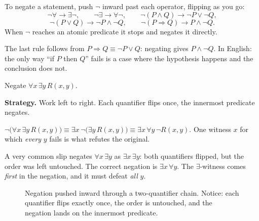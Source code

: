\begin{principle}
To negate a statement, push $\lnot$ inward past each operator, flipping as you go:
\[
\lnot\forall \to \exists\lnot,\qquad
\lnot\exists \to \forall\lnot,\qquad
\lnot(P\land Q) \to \lnot P \lor \lnot Q,
\]
\[
\lnot(P\lor Q) \to \lnot P \land \lnot Q,\qquad
\lnot(P \Rightarrow Q) \to P \land \lnot Q.
\]
When $\lnot$ reaches an atomic predicate it stops and negates it directly.
\end{principle}

The last rule follows from $P\Rightarrow Q \equiv \lnot P \lor Q$: negating gives
$P \land \lnot Q$. In English: the only way ``if $P$ then $Q$'' fails is a case where
the hypothesis happens and the conclusion does not.

\begin{example}\label{ex:negate-chain}
Negate $\forall x\,\exists y\, R(x,y)$.
\par\smallskip
\textbf{Strategy.} Work left to right. Each quantifier flips once, the innermost
predicate negates.
\par\smallskip
\begin{solution}
$\lnot\bigl(\forall x\,\exists y\,R(x,y)\bigr)
\equiv \exists x\,\lnot\bigl(\exists y\,R(x,y)\bigr)
\equiv \exists x\,\forall y\,\lnot R(x,y)$.
One witness $x$ for which \emph{every} $y$ fails is what refutes the original.
\end{solution}
\end{example}

\begin{tripwire}
A very common slip negates $\forall x\,\exists y$ as $\exists x\,\exists y$: both
quantifiers flipped, but the order was left untouched. The correct negation is
$\exists x\,\forall y$. The $\exists$-witness comes \emph{first} in the negation,
and it must defeat \emph{all} $y$.
\end{tripwire}

\begin{figure}[ht]\centering

\caption{Negation pushed inward through a two-quantifier chain. Notice:
each quantifier flips exactly once, the order is untouched, and the
negation lands on the innermost predicate.}
\label{fig:negpush}
\end{figure}

